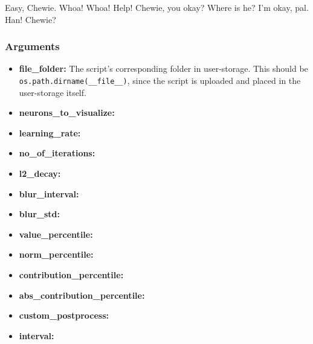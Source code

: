 \noindent Easy, Chewie. Whoa! Whoa! Help! Chewie, you okay? Where is he? I'm okay, pal. Han! Chewie? 

\subsubsection*{Arguments}

\begin{itemize}
    \item \textbf{file\_folder:} The script's corresponding folder in user-storage. This should be \\
    \texttt{os.path.dirname(\_\_file\_\_)}, since the script is uploaded and placed in the user-storage itself.
    \item \textbf{neurons\_to\_visualize:}
    \item \textbf{learning\_rate:}
    \item \textbf{no\_of\_iterations:}
    \item \textbf{l2\_decay:}
    \item \textbf{blur\_interval:}
    \item \textbf{blur\_std:}
    \item \textbf{value\_percentile:}
    \item \textbf{norm\_percentile:}
    \item \textbf{contribution\_percentile:}
    \item \textbf{abs\_contribution\_percentile:}
    \item \textbf{custom\_postprocess:}
    \item \textbf{interval:}
\end{itemize}

\cleardoublepage